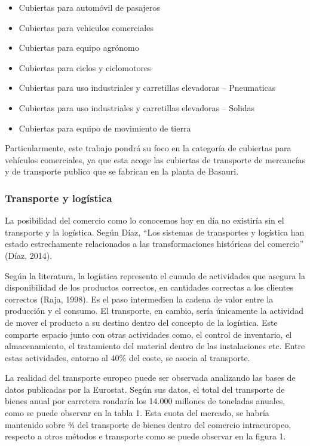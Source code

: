 \documentclass[12pt]{article}
\begin{document}
\begin{itemize}
	\item Cubiertas para automóvil de pasajeros
	\item Cubiertas para vehiculos comerciales
	\item Cubiertas para equipo agrónomo
	\item Cubiertas para ciclos y ciclomotores
	\item Cubiertas para uso industriales y carretillas elevadoras – Pneumaticas
	\item Cubiertas para uso industriales y  carretillas elevadoras – Solidas
	\item Cubiertas para equipo de movimiento de tierra

\end{itemize}

Particularmente, este trabajo pondrá su foco en la categoría de cubiertas para vehículos comerciales, ya que esta acoge las cubiertas de transporte de mercancías y de transporte publico que se fabrican en la planta de Basauri.

\subsubsection{Transporte y logística}

La posibilidad del comercio como lo conocemos hoy en día no existiría sin el transporte y la logística. Según Díaz, “Los sistemas de transportes y logística han estado estrechamente relacionados a las transformaciones históricas del comercio” (Díaz, 2014).

Según la literatura, la logística representa el cumulo de actividades que asegura la disponibilidad de los productos correctos, en cantidades correctas a los clientes correctos (Raja, 1998). Es el paso intermedien la cadena de valor entre la producción y el consumo. El transporte, en cambio, sería únicamente la actividad de mover el producto a su destino dentro del concepto de la logística. Este comparte espacio junto con otras actividades como, el control de inventario, el almacenamiento, el tratamiento del material dentro de las instalaciones etc. Entre estas actividades, entorno al 40\% del coste, se asocia al transporte.

La realidad del transporte europeo puede ser observada analizando las bases de datos publicadas por la Eurostat. Según sus datos, el total del transporte de bienes anual por carretera rondaría los 14.000 millones de toneladas anuales, como se puede observar en la tabla 1. Esta cuota del mercado, se habría mantenido sobre ¾ del transporte de bienes dentro del comercio intraeuropeo, respecto a otros métodos e transporte como se puede observar en la figura 1.
\end{document}
